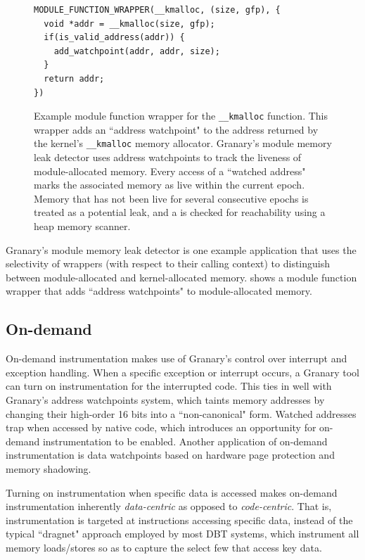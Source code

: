 \documentclass[preprint]{sigplanconf}
\begin{document}
\begin{figure}[t!]
\lstset{language=C, tabsize=2, stepnumber=1}
\begin{lstlisting}[basicstyle=\footnotesize\ttfamily]
MODULE_FUNCTION_WRAPPER(__kmalloc, (size, gfp), {
  void *addr = __kmalloc(size, gfp);
  if(is_valid_address(addr)) {
    add_watchpoint(addr, addr, size);
  }
  return addr;
})
\end{lstlisting}
\caption{Example module function wrapper for the \texttt{\_\_kmalloc} function. This wrapper adds an ``address watchpoint" to the address returned by the kernel's \texttt{\_\_kmalloc} memory allocator. Granary's module memory leak detector uses address watchpoints to track the liveness of module-allocated memory. Every access of a ``watched address" marks the associated memory as live within the current epoch. Memory that has not been live for several consecutive epochs is treated as a potential leak, and a is checked for reachability using a heap memory scanner.}
\label{fig:malloc_wrapper}
\end{figure}

Granary's module memory leak detector is one example application that uses the selectivity of wrappers (with respect to their calling context) to distinguish between module-allocated and kernel-allocated memory.  shows a module function wrapper that adds ``address watchpoints"  \cite{BehaveOrBeWatched} to module-allocated memory.


\subsection{On-demand}

On-demand instrumentation makes use of Granary's control over interrupt and exception handling. When a specific exception or interrupt occurs, a Granary tool can turn on instrumentation for the interrupted code. This ties in well with Granary's address watchpoints system, which taints memory addresses by changing their high-order 16 bits into a ``non-canonical" form. Watched addresses trap when accessed by native code, which introduces an opportunity for on-demand instrumentation to be enabled. Another application of on-demand instrumentation is data watchpoints based on hardware page protection and memory shadowing.

Turning on instrumentation when specific data is accessed makes on-demand instrumentation inherently \emph{data-centric} as opposed to \emph{code-centric}. That is, instrumentation is targeted at instructions accessing specific data, instead of the typical ``dragnet" approach employed by most DBT systems, which instrument all memory loads/stores so as to capture the select few that access key data.
\end{document}
